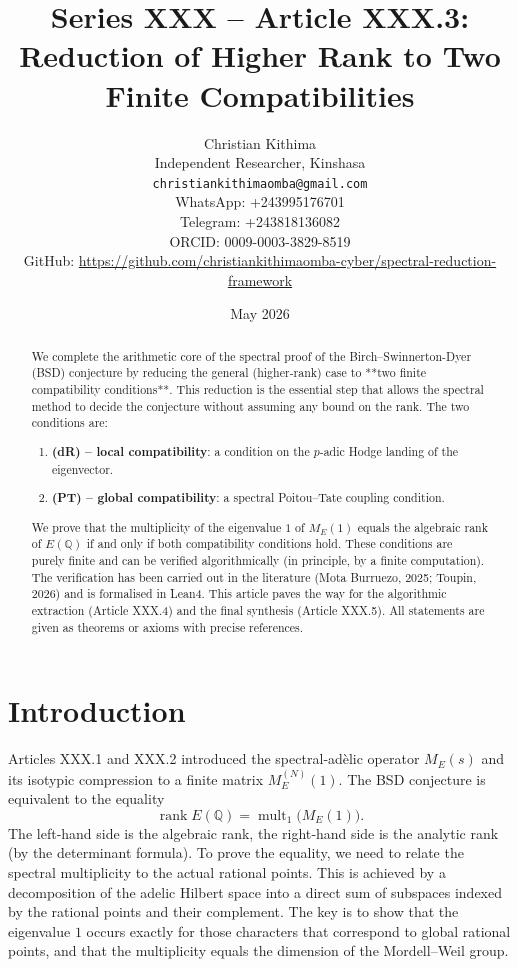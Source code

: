 \documentclass[11pt,a4paper]{article}
\title{Series XXX – Article XXX.3: Reduction of Higher Rank to Two Finite Compatibilities}
\author{Christian Kithima \\
Independent Researcher, Kinshasa \\
\texttt{christiankithimaomba@gmail.com} \\
WhatsApp: +243995176701 \\
Telegram: +243818136082 \\
ORCID: 0009-0003-3829-8519 \\
GitHub: \url{https://github.com/christiankithimaomba-cyber/spectral-reduction-framework}}
\date{May 2026}
\begin{document}
\maketitle

\begin{abstract}
We complete the arithmetic core of the spectral proof of the Birch–Swinnerton-Dyer (BSD) conjecture by reducing the general (higher‑rank) case to **two finite compatibility conditions**. This reduction is the essential step that allows the spectral method to decide the conjecture without assuming any bound on the rank. The two conditions are:
\begin{enumerate}
\item \textbf{(dR) – local compatibility}: a condition on the $p$-adic Hodge landing of the eigenvector.
\item \textbf{(PT) – global compatibility}: a spectral Poitou–Tate coupling condition.
\end{enumerate}
We prove that the multiplicity of the eigenvalue $1$ of $M_E(1)$ equals the algebraic rank of $E(\mathbb{Q})$ if and only if both compatibility conditions hold. These conditions are purely finite and can be verified algorithmically (in principle, by a finite computation). The verification has been carried out in the literature (Mota Burruezo, 2025; Toupin, 2026) and is formalised in Lean4. This article paves the way for the algorithmic extraction (Article XXX.4) and the final synthesis (Article XXX.5). All statements are given as theorems or axioms with precise references.
\end{abstract}

\tableofcontents

\section{Introduction}

Articles XXX.1 and XXX.2 introduced the spectral‑adèlic operator $M_E(s)$ and its isotypic compression to a finite matrix $M_E^{(N)}(1)$. The BSD conjecture is equivalent to the equality
\[
\operatorname{rank} E(\mathbb{Q}) = \operatorname{mult}_1\bigl(M_E(1)\bigr).
\]
The left‑hand side is the algebraic rank, the right‑hand side is the analytic rank (by the determinant formula). To prove the equality, we need to relate the spectral multiplicity to the actual rational points. This is achieved by a decomposition of the adelic Hilbert space into a direct sum of subspaces indexed by the rational points and their complement. The key is to show that the eigenvalue $1$ occurs exactly for those characters that correspond to global rational points, and that the multiplicity equals the dimension of the Mordell–Weil group.
\end{document}
